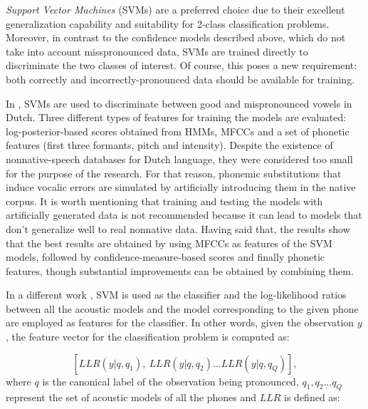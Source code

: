\textit{Support Vector Machines} (SVMs) are a preferred choice 
due to their excellent generalization capability and suitability for 2-class classification
problems. Moreover, in contrast to the confidence models described above, which do not take into
account misspronounced data, SVMs are trained directly to discriminate the two classes of interest.
Of course, this poses a new requirement: both correctly and incorrectly-pronounced data should be
available for training.

In \cite{detection_mispronunciation_dutch_vowel}, SVMs are used to discriminate
between good and mispronounced vowels in Dutch.
Three different types of features for training the models are evaluated: log-posterior-based 
scores obtained from HMMs, MFCCs and a set of 
phonetic features (first three formants, pitch and intensity). Despite the existence of nonnative-speech  
databases for Dutch language, they were considered too small for the purpose of the research. 
For that reason, phonemic 
substitutions that induce vocalic errors are simulated by artificially introducing them in the native corpus. It is worth mentioning that training
and testing the models with artificially generated data is not recommended
because it can lead to models that don't generalize well to real nonnative data.
Having said that, the results show that the best 
results are obtained by using MFCCs as features of the SVM models, followed by confidence-measure-based 
scores and finally phonetic
features, though substantial improvements can be obtained by combining them.

In a different work \cite{svm_space_models}, SVM is used as the classifier and the
log-likelihood ratios between all the acoustic models and the model corresponding to the given
phone are employed as features for the classifier. In other words, given the observation
$y$, the feature vector for the classification problem is computed as: 

\begin{equation}
\label{eq:psm}
[LLR(y|q,q_{1}), \ LLR(y|q,q_{2}) \dotsc LLR(y|q, q_{Q})],
\end{equation}
where $q$ is the canonical label of the observation being pronounced, {$q_{1}, q_{2} 
\dotsc q_{Q}$} represent the set of acoustic models of all the phones and $LLR$ is defined as:

